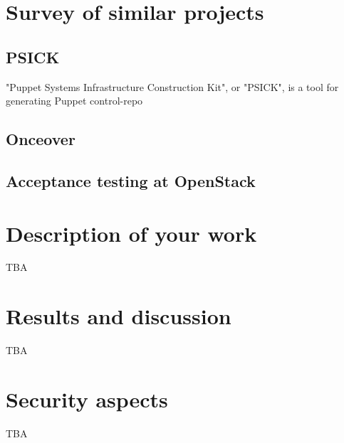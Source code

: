\section{Survey of similar projects}

\subsection{PSICK}

"Puppet Systems Infrastructure Construction Kit", or "PSICK", is a tool for generating Puppet control-repo 

\subsection{Onceover}


\subsection{Acceptance testing at OpenStack}




\section{Description of your work}

TBA


\section{Results and discussion}

TBA


\section{Security aspects}

TBA


